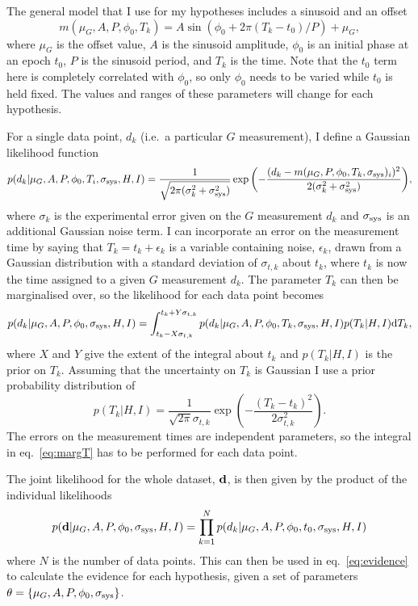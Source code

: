 \documentclass[page-classic]{epl2}
\begin{document}
The general model that I use for my hypotheses includes a sinusoid and an offset
\begin{equation}\label{eq:model}
 m(\mu_G, A, P, \phi_0, T_k) = A\sin{(\phi_0 + 2\pi (T_k-t_0)/P)} + \mu_G,
\end{equation}
where $\mu_G$ is the offset value, $A$ is the sinusoid amplitude, $\phi_0$ is an initial phase at an epoch $t_0$,
$P$ is the sinusoid period, and $T_k$ is the time. Note that the $t_0$ term here is completely correlated
with $\phi_0$, so only $\phi_0$ needs to be varied while $t_0$ is held fixed. The values and ranges of these 
parameters will change for each hypothesis.

For a single data point, $d_k$ (i.e.\ a particular $G$ measurement), I define a Gaussian likelihood function
\begin{equation}
 p(d_k|\mu_G,A,P,\phi_0,T_i,\sigma_{\rm sys},H,I) = \frac{1}{\sqrt{2\pi(\sigma_k^2 + \sigma_{\rm sys}^2)}} \exp{\left(-\frac{(d_k - m(\mu_G,P,\phi_0,T_k,\sigma_{\rm sys})_i)^2}{2(\sigma_k^2 + \sigma_{\rm sys}^2)} \right)},
\end{equation}
where $\sigma_k$ is the experimental error given on the $G$ measurement $d_k$ and $\sigma_{\rm sys}$ is an
additional Gaussian noise term. I can incorporate an error on the measurement time by saying that
$T_k = t_k + \epsilon_k$ is a variable containing noise, $\epsilon_k$, drawn from a Gaussian distribution
with a standard deviation of $\sigma_{t,k}$ about $t_k$, where $t_k$ is now the time assigned to a given $G$ 
measurement $d_k$. The parameter $T_k$ can then be marginalised over, so the likelihood for each data point becomes
\begin{equation}\label{eq:margT}
 p(d_k|\mu_G, A, P, \phi_0, \sigma_{\rm sys},H,I) = \int_{t_k-X\sigma_{t,k}}^{t_k+Y\sigma_{t,k}}  p(d_k|\mu_G, A, P, \phi_0, T_k, \sigma_{\rm sys},H,I) p(T_k|H,I) {\rm d}T_k,
\end{equation}
where $X$ and $Y$ give the extent of the integral about $t_k$ and $p(T_k|H,I)$ is the prior on $T_k$.
Assuming that the uncertainty on $T_k$ is Gaussian I use a prior probability distribution of
\begin{equation}
 p(T_k|H,I) = \frac{1}{\sqrt{2\pi}\sigma_{t,k}}\exp{\left(-\frac{(T_k-t_k)^2}{2\sigma_{t,k}^2} \right)}.
\end{equation}
The errors on the measurement times are independent parameters, so the integral in eq.~\ref{eq:margT} has to be
performed for each data point.

The joint likelihood for the whole dataset, $\mathbf{d}$, is then given by the product of the individual likelihoods
\begin{equation}\label{eq:jointlike}
 p(\mathbf{d}|\mu_G, A, P, \phi_0, \sigma_{\rm sys},H,I) = \prod_{k=1}^N p(d_k|\mu_G, A, P, \phi_0, t_0,\sigma_{\rm sys},H,I)
\end{equation}
where $N$ is the number of data points. This can then be used in eq.~\ref{eq:evidence} to calculate the evidence
for each hypothesis, given a set of parameters $\mathbf{\theta} = \{\mu_G, A, P, \phi_0, \sigma_{\rm sys}\}$.
\end{document}
